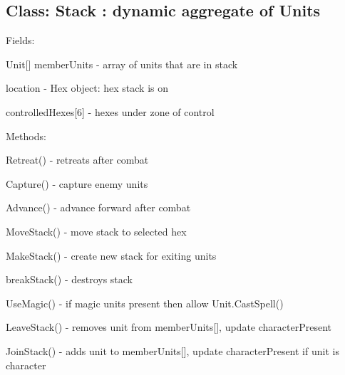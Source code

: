 \subsection*{Class:  Stack  :  dynamic aggregate of Units}
\begin{al}
	\item[Fields:] \parbox{\textwidth}{Unit[] memberUnits - array of units that are in stack}
    \item[] \parbox{\textwidth}{location - Hex object: hex stack is on}
    \item[] \parbox{\textwidth}{controlledHexes[6] - hexes under zone of control}
	\item[Methods:]\parbox{\textwidth}{Retreat() - retreats after combat}
    \item[] \parbox{\textwidth}{Capture() - capture enemy units}
    \item[] \parbox{\textwidth}{Advance() - advance forward after combat}
    \item[] \parbox{\textwidth}{MoveStack()  -  move stack to selected hex}
    \item[] \parbox{\textwidth}{MakeStack() - create new stack for exiting units}
    \item[] \parbox{\textwidth}{breakStack() - destroys stack}
    \item[] \parbox{\textwidth}{UseMagic() - if magic units present then allow Unit.CastSpell()}
    \item[] \parbox{\textwidth}{LeaveStack()  - removes unit from memberUnits[], update characterPresent}
    \item[] \parbox{\textwidth}{JoinStack()  -  adds unit to memberUnits[], update characterPresent if unit is character}
\end{al}


